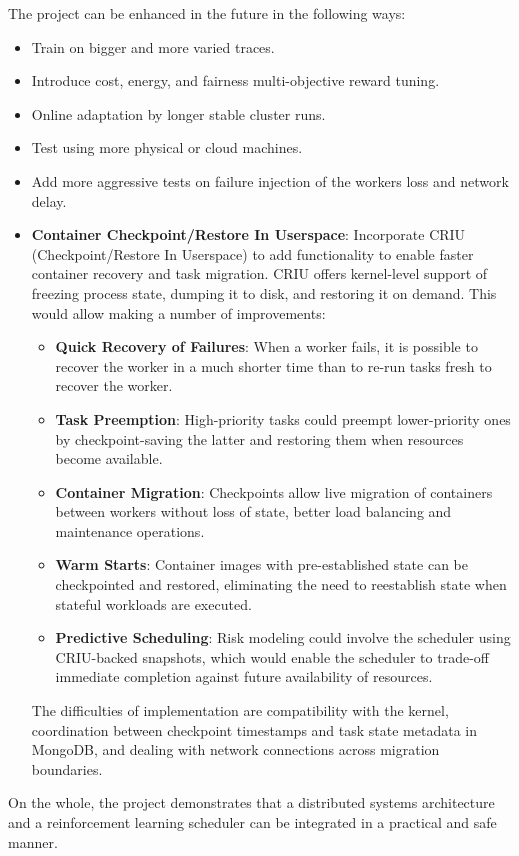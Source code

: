 The project can be enhanced in the future in the following ways:

\begin{itemize}
    \item Train on bigger and more varied traces.
    \item Introduce cost, energy, and fairness multi-objective reward tuning.
    \item Online adaptation by longer stable cluster runs.
    \item Test using more physical or cloud machines.
    \item Add more aggressive tests on failure injection of the workers loss and network delay.
    \item \textbf{Container Checkpoint/Restore In Userspace}: Incorporate CRIU (Checkpoint/Restore In Userspace) to add functionality to enable faster container recovery and task migration. CRIU offers kernel-level support of freezing process state, dumping it to disk, and restoring it on demand. This would allow making a number of improvements:
    \begin{itemize}
        \item \textbf{Quick Recovery of Failures}: When a worker fails, it is possible to recover the worker in a much shorter time than to re-run tasks fresh to recover the worker.
        \item \textbf{Task Preemption}: High-priority tasks could preempt lower-priority ones by checkpoint-saving the latter and restoring them when resources become available.
        \item \textbf{Container Migration}: Checkpoints allow live migration of containers between workers without loss of state, better load balancing and maintenance operations.
        \item \textbf{Warm Starts}: Container images with pre-established state can be checkpointed and restored, eliminating the need to reestablish state when stateful workloads are executed.
        \item \textbf{Predictive Scheduling}: Risk modeling could involve the scheduler using CRIU-backed snapshots, which would enable the scheduler to trade-off immediate completion against future availability of resources.
    \end{itemize}
    The difficulties of implementation are compatibility with the kernel, coordination between checkpoint timestamps and task state metadata in MongoDB, and dealing with network connections across migration boundaries.
\end{itemize}

On the whole, the project demonstrates that a distributed systems architecture and a reinforcement learning scheduler can be integrated in a practical and safe manner.
